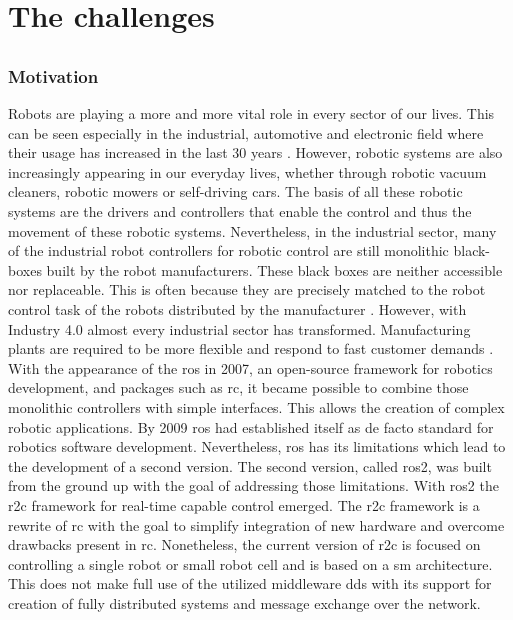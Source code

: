 \part{The challenges}
\chapter{}
\label{sec:Introduction}
\section{Motivation}
Robots are playing a more and more vital role in every sector of our lives. This can be seen especially in the industrial, automotive and electronic field where their usage has increased in the last 30 years \cite{cheng_rise_2019, bilancia_overview_2023}. However, robotic systems are also increasingly appearing in our everyday lives, whether through robotic vacuum cleaners, robotic mowers or self-driving cars. The basis of all these robotic systems are the drivers and controllers that enable the control and thus the movement of these robotic systems. Nevertheless, in the industrial sector, many of the industrial robot controllers for robotic control are still monolithic black-boxes built by the robot manufacturers. These black boxes are neither accessible nor replaceable. This is often because they are precisely matched to the robot control task of the robots distributed by the manufacturer \cite{puck_distributed_2020, plasberg_towards_2022}. However, with Industry 4.0 almost every industrial sector has transformed. Manufacturing plants are required to be more flexible and respond to fast customer demands \cite{bilancia_overview_2023}. \newline
With the appearance of the \gls{ros} in 2007, an open-source framework for robotics development, and packages such as \gls{rc}, it became possible to combine those monolithic controllers with simple interfaces. This allows the creation of complex robotic applications. By 2009 \gls{ros} had established itself as de facto standard for robotics software development. Nevertheless, \gls{ros} has its limitations which lead to the development of a second version. The second version, called \gls{ros2}, was built from the ground up with the goal of addressing those limitations. \newline
With \gls{ros2} the \gls{r2c} framework for real-time capable control emerged. The \gls{r2c} framework is a rewrite of \gls{rc} with the goal to simplify integration of new hardware and overcome drawbacks present in \gls{rc}. Nonetheless, the current version of \gls{r2c} is focused on controlling a single robot or small robot cell and is based on a \gls{sm} architecture. This does not make full use of the utilized middleware \gls{dds} with its support for creation of fully distributed systems and message exchange over the network. \newline

